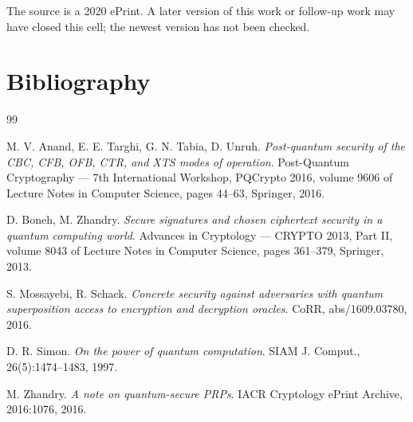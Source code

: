 \documentclass{conjura-conjecture}
\begin{document}
\begin{remark}\label{rem:currency}
The source is a 2020 ePrint. A later version of this work or follow-up
work may have closed this cell; the newest version has not been checked.
\end{remark}

\section{Bibliography}

\begin{conjurabibliography}{99}

M. V. Anand, E. E. Targhi, G. N. Tabia, D. Unruh.
\emph{Post-quantum security of the CBC, CFB, OFB, CTR, and XTS modes of
operation}.
Post-Quantum Cryptography --- 7th International Workshop, PQCrypto 2016,
volume 9606 of Lecture Notes in Computer Science, pages 44--63,
Springer, 2016.

D. Boneh, M. Zhandry.
\emph{Secure signatures and chosen ciphertext security in a quantum
computing world}.
Advances in Cryptology --- CRYPTO 2013, Part II, volume 8043 of Lecture
Notes in Computer Science, pages 361--379, Springer, 2013.

S. Mossayebi, R. Schack.
\emph{Concrete security against adversaries with quantum superposition
access to encryption and decryption oracles}.
CoRR, abs/1609.03780, 2016.

D. R. Simon.
\emph{On the power of quantum computation}.
SIAM J. Comput., 26(5):1474--1483, 1997.

M. Zhandry.
\emph{A note on quantum-secure PRPs}.
IACR Cryptology ePrint Archive, 2016:1076, 2016.

\end{conjurabibliography}
\end{document}
